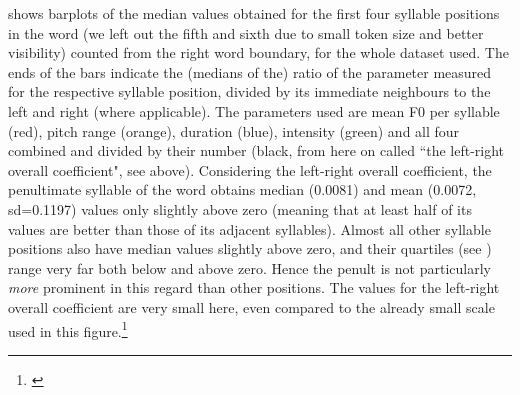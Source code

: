\documentclass[output=paper]{LSP/langsci}
\begin{document}
 shows barplots of the median values obtained for the first four syllable positions in the word (we left out the fifth and sixth due to small token size and better visibility) counted from the right word boundary, for the whole dataset used. The ends of the bars indicate the (medians of the) ratio of the parameter measured for the respective syllable position, divided by its immediate neighbours to the left and right (where applicable). The parameters used are mean F0 per syllable (red), pitch range (orange), duration (blue), intensity (green) and all four combined and divided by their number (black, from here on called ``the left-right overall coefficient", see above). Considering the left-right overall coefficient, the penultimate syllable of the word obtains median (0.0081) and mean (0.0072, sd=0.1197) values only slightly above zero (meaning that at least half of its values are better than those of its adjacent syllables). Almost all other syllable positions also have median values slightly above zero, and their quartiles (see ) range very far both below and above zero. Hence the penult is not particularly \textit{more} prominent in this regard than other positions. The values for the left-right overall coefficient are very small here, even compared to the already small scale used in this figure.\footnote{%
\begin{samepage}

\end{samepage}}
\end{document}
